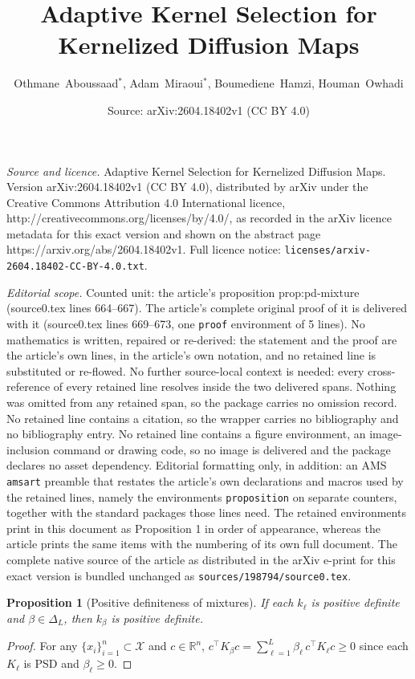 \documentclass[10pt,a4paper]{amsart}
\title{Adaptive Kernel Selection for Kernelized Diffusion Maps}
\author{Othmane~Aboussaad$^{\ast}$, Adam~Miraoui$^{\ast}$, Boumediene~Hamzi, Houman~Owhadi}
\date{Source: arXiv:2604.18402v1 (CC BY 4.0)}
\newtheorem{proposition}{Proposition}
\begin{document}
\maketitle

\noindent\emph{Source and licence.} Adaptive Kernel Selection for Kernelized Diffusion Maps. Version arXiv:2604.18402v1 (CC BY 4.0), distributed by arXiv under the Creative Commons Attribution 4.0 International licence, http://creativecommons.org/licenses/by/4.0/, as recorded in the arXiv licence metadata for this exact version and shown on the abstract page https://arxiv.org/abs/2604.18402v1. Full licence notice: \texttt{licenses/arxiv-2604.18402-CC-BY-4.0.txt}.\par\smallskip

\noindent\textit{Editorial scope.} Counted unit: the article's proposition prop:pd-mixture (source0.tex lines 664--667). The article's complete original proof of it is delivered with it (source0.tex lines 669--673, one \texttt{proof} environment of 5 lines). No mathematics is written, repaired or re-derived: the statement and the proof are the article's own lines, in the article's own notation, and no retained line is substituted or re-flowed.  No further source-local context is needed: every cross-reference of every retained line resolves inside the two delivered spans.  Nothing was omitted from any retained span, so the package carries no omission record.  No retained line contains a citation, so the wrapper carries no bibliography and no bibliography entry.  No retained line contains a figure environment, an image-inclusion command or drawing code, so no image is delivered and the package declares no asset dependency.  Editorial formatting only, in addition: an AMS \texttt{amsart} preamble that restates the article's own declarations and macros used by the retained lines, namely the environments \texttt{proposition} on separate counters, together with the standard packages those lines need.  The retained environments print in this document as Proposition 1 in order of appearance, whereas the article prints the same items with the numbering of its own full document.  The complete native source of the article as distributed in the arXiv e-print for this exact version is bundled unchanged as \texttt{sources/198794/source0.tex}.
\begin{proposition}[Positive definiteness of mixtures]
\label{prop:pd-mixture}
If each $k_\ell$ is positive definite and $\beta\in\Delta_L$, then $k_\beta$ is positive definite.
\end{proposition}

\begin{proof}
For any $\{x_i\}_{i=1}^n\subset\mathcal{X}$ and $c\in\mathbb{R}^n$,
$c^\top K_\beta c = \sum_{\ell=1}^L \beta_\ell\, c^\top K_\ell c \ge 0$
since each $K_\ell$ is PSD and $\beta_\ell\ge 0$.
\end{proof}
\end{document}

